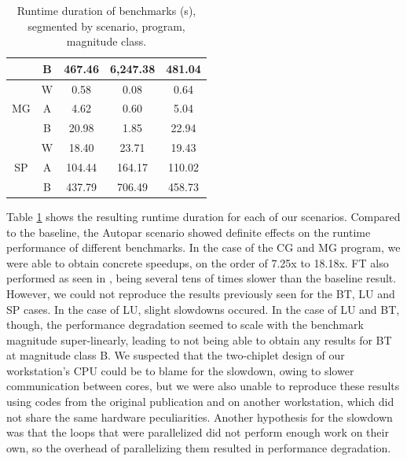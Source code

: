\begin{table}[]
\begin{tabular}{|c|c|ccc|}
                         & B                                                                          & 467.46   & 6,247.38  & 481.04    \\ \hline
\multirow{3}{*}{MG}      & W                                                                          & 0.58     & 0.08      & 0.64      \\
                         & A                                                                          & 4.62     & 0.60      & 5.04      \\
                         & B                                                                          & 20.98    & 1.85      & 22.94     \\ \hline
\multirow{3}{*}{SP}      & W                                                                          & 18.40    & 23.71     & 19.43     \\
                         & A                                                                          & 104.44   & 164.17    & 110.02    \\
                         & B                                                                          & 437.79   & 706.49    & 458.73    \\ \hline
\end{tabular}
\caption{Runtime duration of benchmarks (s), segmented by scenario, program, magnitude class.}
\label{tab:expc-results}
\end{table}

Table \ref{tab:expc-results} shows the resulting runtime duration for each of our scenarios. Compared to the baseline, the Autopar scenario showed definite effects on the runtime performance of different benchmarks. In the case of the CG and MG program, we were able to obtain concrete speedups, on the order of 7.25x to 18.18x. FT also performed as seen in \cite{Arabnejad2020}, being several tens of times slower than the baseline result. However, we could not reproduce the results previously seen for the BT, LU and SP cases. In the case of LU, slight slowdowns occured. In the case of LU and BT, though, the performance degradation seemed to scale with the benchmark magnitude super-linearly, leading to not being able to obtain any results for BT at magnitude class B. We suspected that the two-chiplet design of our workstation's CPU could be to blame for the slowdown, owing to slower communication between cores, but we were also unable to reproduce these results using codes from the original publication and on another workstation, which did not share the same hardware peculiarities. Another hypothesis for the slowdown was that the loops that were parallelized did not perform enough work on their own, so the overhead of parallelizing them resulted in performance degradation.


